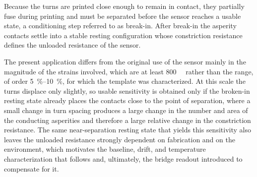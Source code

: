 Because the turns are printed close enough to remain in contact, they partially fuse during printing and must be separated before the sensor reaches a usable state, a conditioning step referred to as break-in. After break-in the asperity contacts settle into a stable resting configuration whose constriction resistance defines the unloaded resistance of the sensor.

The present application differs from the original use of the sensor mainly in the magnitude of the strains involved, which are at least \SI{800}{\micro\strain} rather than the range, of order \SIrange{5}{10}{\percent}, for which the template was characterized. At this scale the turns displace only slightly, so usable sensitivity is obtained only if the broken-in resting state already places the contacts close to the point of separation, where a small change in turn spacing produces a large change in the number and area of the conducting asperities and therefore a large relative change in the constriction resistance. The same near-separation resting state that yields this sensitivity also leaves the unloaded resistance strongly dependent on fabrication and on the environment, which motivates the baseline, drift, and temperature characterization that follows and, ultimately, the bridge readout introduced to compensate for it.